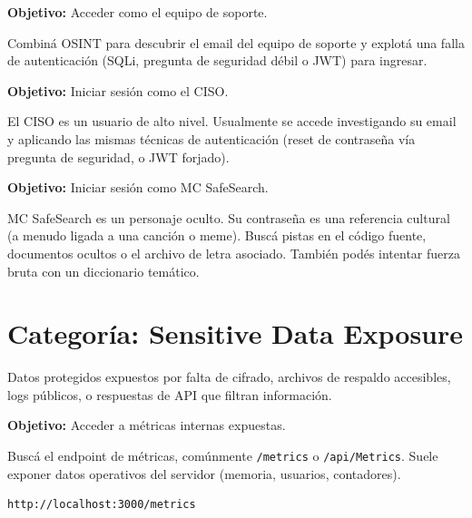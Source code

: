 \documentclass[11pt,a4paper]{article}
\begin{document}
\begin{desafio}
\textbf{Objetivo:} Acceder como el equipo de soporte.
\begin{solucion}
Combiná OSINT para descubrir el email del equipo de soporte y explotá una falla de autenticación (SQLi, pregunta de seguridad débil o JWT) para ingresar.
\end{solucion}
\end{desafio}

\begin{desafio}
\textbf{Objetivo:} Iniciar sesión como el CISO.
\begin{solucion}
El CISO es un usuario de alto nivel. Usualmente se accede investigando su email y aplicando las mismas técnicas de autenticación (reset de contraseña vía pregunta de seguridad, o JWT forjado).
\end{solucion}
\end{desafio}

\begin{desafio}
\textbf{Objetivo:} Iniciar sesión como MC SafeSearch.
\begin{solucion}
MC SafeSearch es un personaje oculto. Su contraseña es una referencia cultural (a menudo ligada a una canción o meme). Buscá pistas en el código fuente, documentos ocultos o el archivo de letra asociado. También podés intentar fuerza bruta con un diccionario temático.
\end{solucion}
\end{desafio}

\section{Categoría: Sensitive Data Exposure}

\begin{teoria}
Datos protegidos expuestos por falta de cifrado, archivos de respaldo accesibles, logs públicos, o respuestas de API que filtran información.
\end{teoria}

\begin{desafio}
\textbf{Objetivo:} Acceder a métricas internas expuestas.
\begin{solucion}
Buscá el endpoint de métricas, comúnmente \texttt{/metrics} o \texttt{/api/Metrics}. Suele exponer datos operativos del servidor (memoria, usuarios, contadores).
\begin{lstlisting}
http://localhost:3000/metrics
\end{lstlisting}
\end{solucion}
\end{desafio}
\end{document}
